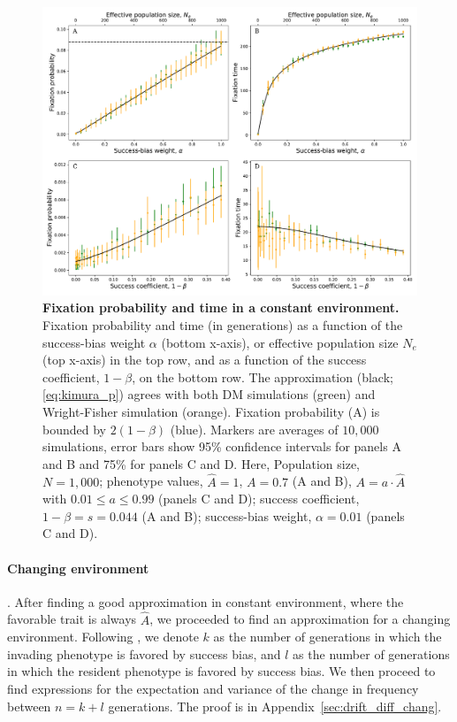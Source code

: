 \documentclass[12pt]{extarticle}
\begin{document}
\begin{figure}[h]
    \includegraphics[width=\linewidth]{../figures/final/kimura_var.pdf}
  \caption{\textbf{Fixation probability and time in a constant environment.}
  Fixation probability and time (in generations) as a function of the success-bias weight $\alpha$ (bottom x-axis), or effective population size $N_e$ (top x-axis) in the top row, and as a function of the success coefficient, $1-\beta$, on the bottom row.
  The approximation (black; \cref{eq:kimura_p}) agrees with both DM simulations (green) and Wright-Fisher simulation (orange).
  Fixation probability (A) is bounded by $2(1-\beta)$ (blue).
  Markers are averages of $10,000$ simulations, error bars show 95\% confidence intervals for panels A and B and 75\% for panels C and D.
   Here, Population size, $N=1,000$; phenotype values, $\hat{A}=1$, $A=0.7$ (A and B), $A = a \cdot \hat{A}$ with $0.01 \le a \le 0.99$ (panels C and D); success coefficient, $1-\beta=s=0.044$ (A and B); success-bias weight, $\alpha=0.01$ (panels C and D).}
  \label{fig:var_alpha}
\end{figure}


\paragraph*{Changing environment}. After finding a good approximation in constant environment, where the favorable trait is always $\hat{A}$, we proceeded to find an approximation for a changing environment. 
Following \citet{changeEnv}, we denote $k$ as the number of generations in which the invading phenotype is favored by success bias, and $l$ as the number of generations in which the resident phenotype is favored by success bias.
We then proceed to find expressions for the expectation and variance of the change in frequency between $n=k+l$ generations. 
The proof is in Appendix~\ref{sec:drift_diff_chang}.
\\
\end{document}
